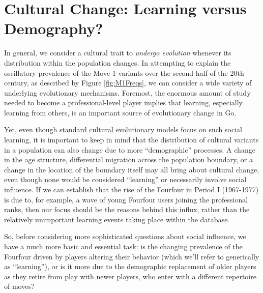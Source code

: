  
\section{Cultural Change: Learning versus Demography?}

In general, we consider a cultural trait to \textit{undergo evolution} whenever its distribution within the population changes.  In attempting to explain the oscillatory prevalence of the Move 1 variants over the second half of the 20th century, as described by Figure \ref{fig:M1Freqs}, we can consider a wide variety of underlying evolutionary mechanisms.  Foremost, the enormous amount of study needed to become a professional-level player implies that learning, especially learning from others, is an important source of evolutionary change in Go.
  
Yet, even though standard cultural evolutionary models focus on such social learning, it is important to keep in mind that the distribution of cultural variants in a population can also change due to more ``demographic'' processes.  A change in the age structure, differential migration across the population boundary, or a change in the location of the boundary itself may all bring about cultural change, even though none would be considered ``learning'' or necessarily involve social influence.  If we can establish that the rise of the Fourfour in Period I (1967-1977) is due to, for example, a wave of young Fourfour users joining the professional ranks, then our focus should be the reasons behind this influx, rather than the relatively unimportant learning events taking place within the database.

So, before considering more sophisticated questions about social influence, we have a much more basic and essential task: is the changing prevalence of the Fourfour driven by players altering their behavior (which we'll refer to generically as ``learning''), or is it more due to the demographic replacement of older players as they retire from play with newer players, who enter with a different repertoire of moves?  

